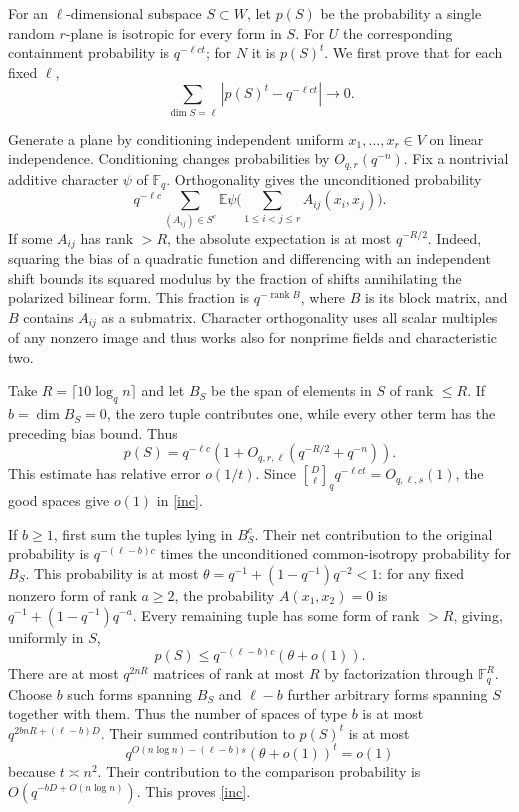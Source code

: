 \documentclass[11pt]{article}
\newcommand{\F}{\mathbb F}
\newcommand{\E}{\mathbb E}
\newcommand{\rank}{\operatorname{rank}}
\newcommand{\gb}[2]{\genfrac{[}{]}{0pt}{}{#1}{#2}_{q}}
\begin{document}
For an $\ell$-dimensional subspace $S\subset W$, let $p(S)$ be the probability a single random $r$-plane is isotropic for every form in $S$. For $U$ the corresponding containment probability is $q^{-\ell ct}$; for $N$ it is $p(S)^t$. We first prove that for each fixed $\ell$,
\begin{equation}\label{inc}
 \sum_{\dim S=\ell}\left|p(S)^t-q^{-\ell ct}\right|\longrightarrow0 .
\end{equation}

Generate a plane by conditioning independent uniform $x_1,\ldots,x_r\in V$ on linear independence. Conditioning changes probabilities by $O_{q,r}(q^{-n})$. Fix a nontrivial additive character $\psi$ of $\F_q$. Orthogonality gives the unconditioned probability
\[
 q^{-\ell c}\sum_{(A_{ij})\in S^c}
 \E\psi\bigg(\sum_{1\le i<j\le r} A_{ij}(x_i,x_j)\bigg).
\]
If some $A_{ij}$ has rank $>R$, the absolute expectation is at most $q^{-R/2}$. Indeed, squaring the bias of a quadratic function and differencing with an independent shift bounds its squared modulus by the fraction of shifts annihilating the polarized bilinear form. This fraction is $q^{-\rank B}$, where $B$ is its block matrix, and $B$ contains $A_{ij}$ as a submatrix. Character orthogonality uses all scalar multiples of any nonzero image and thus works also for nonprime fields and characteristic two.

Take $R=\lceil 10\log_q n\rceil$ and let $B_S$ be the span of elements in $S$ of rank $\le R$. If $b=\dim B_S=0$, the zero tuple contributes one, while every other term has the preceding bias bound. Thus
\[
 p(S)=q^{-\ell c}(1+O_{q,r,\ell}(q^{-R/2}+q^{-n})).
\]
This estimate has relative error $o(1/t)$. Since $\gb D\ell q^{-\ell ct}=O_{q,\ell,s}(1)$, the good spaces give $o(1)$ in \eqref{inc}.

If $b\ge1$, first sum the tuples lying in $B_S^c$. Their net contribution to the original probability is $q^{-(\ell-b)c}$ times the unconditioned common-isotropy probability for $B_S$. This probability is at most $\theta=q^{-1}+(1-q^{-1})q^{-2}<1$: for any fixed nonzero form of rank $a\ge2$, the probability $A(x_1,x_2)=0$ is $q^{-1}+(1-q^{-1})q^{-a}$. Every remaining tuple has some form of rank $>R$, giving, uniformly in $S$,
\[
 p(S)\le q^{-(\ell-b)c}(\theta+o(1)).
\]
There are at most $q^{2nR}$ matrices of rank at most $R$ by factorization through $\F_q^R$. Choose $b$ such forms spanning $B_S$ and $\ell-b$ further arbitrary forms spanning $S$ together with them. Thus the number of spaces of type $b$ is at most $q^{2bnR+(\ell-b)D}$. Their summed contribution to $p(S)^t$ is at most
\[
 q^{O(n\log n)-(\ell-b)s}(\theta+o(1))^t=o(1)
\]
because $t\asymp n^2$. Their contribution to the comparison probability is $O(q^{-bD+O(n\log n)})$. This proves \eqref{inc}.
\end{document}
